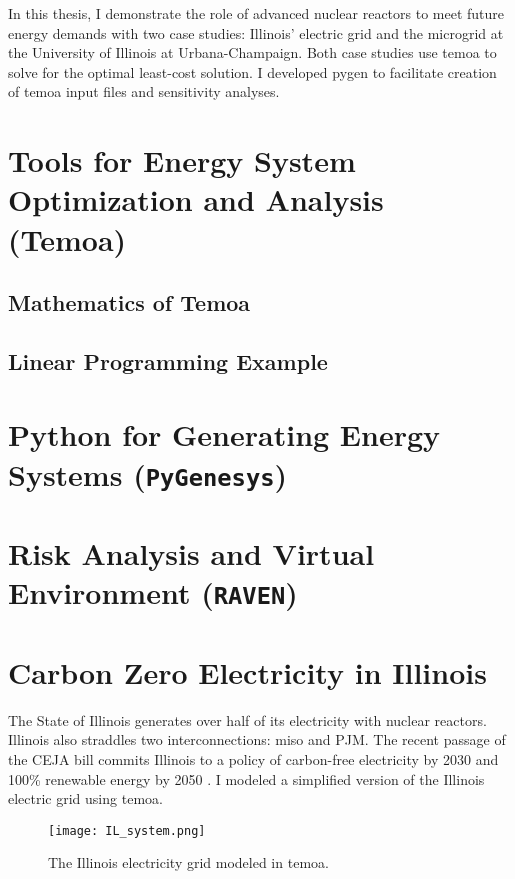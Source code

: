 In this thesis, I demonstrate the role of advanced nuclear reactors to meet future
energy demands with two case studies: Illinois’ electric grid and the microgrid
at the University of Illinois at Urbana-Champaign. Both case studies use \gls{temoa}
to solve for the optimal least-cost solution. I developed \gls{pygen} to
facilitate creation of \gls{temoa} input files and sensitivity analyses.

\section{Tools for Energy System Optimization and Analysis (Temoa)}
\subsection{Mathematics of Temoa}
\subsection{Linear Programming Example}

\section{Python for Generating Energy Systems (\texttt{PyGenesys})}

\section{Risk Analysis and Virtual Environment (\texttt{RAVEN})}


\section{Carbon Zero Electricity in Illinois}
\label{section:ilmodel}
The State of Illinois generates over half of its electricity with nuclear reactors.
Illinois also straddles two interconnections: \gls{miso} and PJM. The recent
passage of the CEJA bill commits Illinois to a policy of carbon-free electricity
by 2030 and 100\% renewable energy by 2050 \cite{harmon_climate_2021}.
I modeled a simplified version of the Illinois electric grid using \gls{temoa}.

\begin{figure}[H]
  \centering
  \texttt{[image: IL\_system.png]}
  \caption{The Illinois electricity grid modeled in \gls{temoa}.}
  \label{fig:ilsys}
\end{figure}

